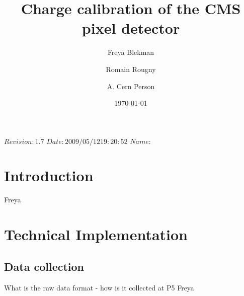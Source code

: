 \RCS$Revision: 1.7 $
\RCS$Date: 2009/05/12 19:20:52 $
\RCS$Name:  $

\title{Charge calibration of the CMS pixel detector}%

\address[unkno]{unknown}
\address[neu]{Universiteit Antwerpen}
\address[cu]{Cornell University}
\author[cu]{Freya Blekman}
\author[ua]{Romain Rougny}
\author[unkno]{A. Cern Person}

\date{\today}


\maketitle %

\section{Introduction}
Freya
\section{Technical Implementation}
\subsection{Data collection}
What is the raw data format - how is it collected at P5
Freya
